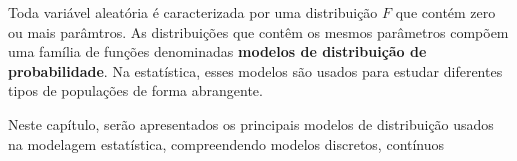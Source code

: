 Toda variável aleatória é caracterizada por uma distribuição $F$ que contém zero ou
mais parâmtros.
As distribuições que contêm os mesmos parâmetros compõem uma família de funções denominadas
\textbf{modelos de distribuição de probabilidade}.
Na estatística, esses modelos são usados para estudar diferentes tipos de populações
de forma abrangente.

Neste capítulo, serão apresentados os principais modelos de distribuição usados
na modelagem estatística, compreendendo modelos discretos, contínuos
